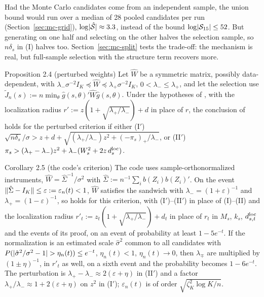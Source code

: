 Had the Monte Carlo candidates come from an independent sample, the union bound would run over a median of 28 pooled candidates per run (Section~\ref{sec:mc-grid}), $\log\lvert \hat{\mathcal{S}}\rvert \approx 3.3$, instead of the bound $\log\lvert \mathcal{S}_{15}\rvert \le 52$. But generating on one half and selecting on the other halves the selection sample, so $n\delta_s$ in (I) halves too. Section~\ref{sec:mc-split} tests the trade-off: the mechanism is real, but full-sample selection with the structure term recovers more.

\begin{result}[Proposition2.4]{Proposition 2.4 (perturbed weights)}
Let $\hat W$ be a symmetric matrix, possibly data-dependent, with $\lambda_-\sigma^{-2}I_K \preceq \hat W \preceq \lambda_+\sigma^{-2}I_K$, $0 < \lambda_- \le \lambda_+$, and let the selection use $\tilde J_n(s) := n\min_\theta\hat g(s,\theta)'\hat W\hat g(s,\theta)$. Under the hypotheses of , with the localization radius $r' := z(1 + \sqrt{\lambda_+/\lambda_-}) + d$ in place of $r$, the conclusion of  holds for the perturbed criterion if either
(I$'$) $\sqrt{n\delta_s}/\sigma > z + d + \sqrt{(\lambda_+/\lambda_-)z^2 + (-\pi_s)_+/\lambda_-}$, or
(II$'$) $\pi_s > (\lambda_+ - \lambda_-)z^2 + \lambda_-(W_s^2 + 2z\,d^{\mathrm{loc}}_s)$.
\end{result}

\begin{result}[Corollary2.5]{Corollary 2.5 (the code's criterion)}
The code uses sample-orthonormalized instruments, $\hat W = \hat\Sigma^{-1}/\sigma^2$ with $\hat\Sigma := n^{-1}\sum_ib(Z_i)b(Z_i)'$. On the event $\lVert \hat\Sigma - I_K\rVert \le \varepsilon := \varepsilon_n(t) < 1$, $\hat W$ satisfies the sandwich with $\lambda_- = (1 + \varepsilon)^{-1}$ and $\lambda_+ = (1 - \varepsilon)^{-1}$, so  holds for this criterion, with (I$'$)--(II$'$) in place of (I)--(II) and the localization radius $r'_t := z_t(1 + \sqrt{\lambda_+/\lambda_-}) + d_t$ in place of $r_t$ in $M_s$, $k_s$, $d^{\mathrm{loc}}_{s,t}$ and the events of its proof, on an event of probability at least $1 - 5e^{-t}$. If the normalization is an estimated scale $\hat\sigma^2$ common to all candidates with $P(\lvert \hat\sigma^2/\sigma^2 - 1\rvert > \eta_n(t)) \le e^{-t}$, $\eta_n(t) < 1$, $\eta_n(t) \to 0$, then $\lambda_\mp$ are multiplied by $(1 \pm \eta)^{-1}$, in $r'_t$ as well, on a sixth event and the probability becomes $1 - 6e^{-t}$. The perturbation is $\lambda_+ - \lambda_- \approx 2(\varepsilon + \eta)$ in (II$'$) and a factor $\lambda_+/\lambda_- \approx 1 + 2(\varepsilon + \eta)$ on $z^2$ in (I$'$); $\varepsilon_n(t)$ is of order $\sqrt{\zeta_K^2\log K/n}$.
\end{result}

